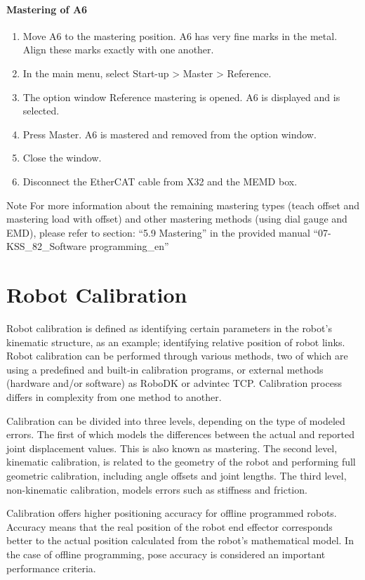 \paragraph{Mastering of A6}
\begin{enumerate}
	\item Move A6 to the mastering position. A6 has very fine marks in the metal. Align these marks exactly with one another.
	\item In the main menu, select Start-up > Master > Reference.
	\item The option window Reference mastering is opened. A6 is displayed and is selected.
	\item Press Master. A6 is mastered and removed from the option window.
	\item Close the window.
	\item Disconnect the EtherCAT cable from X32 and the MEMD box.
\end{enumerate}
\begin{mynotebox}{Note}
For more information about the remaining mastering types (teach offset and mastering load with offset) and other mastering methods (using dial gauge and EMD), please refer to section:
“5.9 Mastering” in the provided manual “07-KSS\_82\_Software programming\_en”
\end{mynotebox}


\section{Robot Calibration}
Robot calibration is defined as identifying certain parameters in the robot’s kinematic structure, as an example; identifying relative position of robot links. Robot calibration can be performed through various methods, two of which are using a predefined and built-in calibration programs, or external methods (hardware and/or software) as RoboDK or advintec TCP. Calibration process differs in complexity from one method to another. 

Calibration can be divided into three levels, depending on the type of modeled errors. The first of which models the differences between the actual and reported joint displacement values. This is also known as mastering. The second level, kinematic calibration, is related to the geometry of the robot and performing full geometric calibration, including angle offsets and joint lengths. The third level, non-kinematic calibration, models errors such as stiffness and friction.

Calibration offers higher positioning accuracy for offline programmed robots. Accuracy means that the real position of the robot end effector corresponds better to the actual position calculated from the robot’s mathematical model. In the case of offline programming, pose accuracy is considered an important performance criteria.

